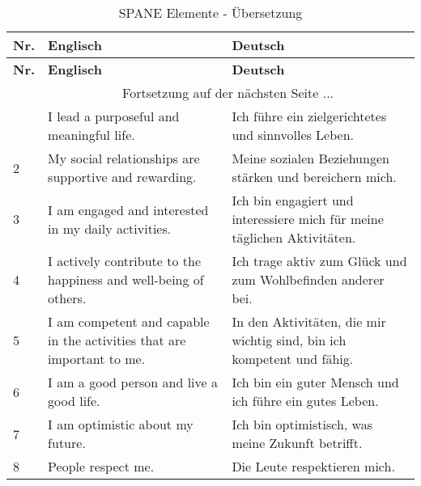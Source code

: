 \begin{RaggedRight}
\begin{center}
    \begin{longtable}[t]{|p{0.8 cm}|p{6.6 cm}|p{6.6 cm}|}
    \caption{SPANE Elemente - Übersetzung} \\ \hline
        \textbf{Nr.} & \textbf{Englisch} & \textbf{Deutsch} \\ \hline
        \endfirsthead
        \hline
        \textbf{Nr.} & \textbf{Englisch} & \textbf{Deutsch} \\ \hline
        \endhead 
        & \multicolumn{2}{|c|}{Fortsetzung auf der nächsten Seite $...$ } \\ \hline
        \endfoot
        \hline
        \endlastfoot
        1 & I lead a purposeful and meaningful life. & Ich führe ein zielgerichtetes und sinnvolles Leben.\\
        2 & My social relationships are supportive and rewarding. & Meine sozialen Beziehungen stärken und bereichern mich. \\
        3 & I am engaged and interested in my daily activities. & Ich bin engagiert und interessiere mich für meine täglichen Aktivitäten.\\
        4 & I actively contribute to the happiness and well-being of others. & Ich trage aktiv zum Glück und zum Wohlbefinden anderer bei.\\
        5 & I am competent and capable in the activities that are important to me. & In den Aktivitäten, die mir wichtig sind, bin ich kompetent und fähig.\\
        6 & I am a good person and live a good life. & Ich bin ein guter Mensch und ich führe ein gutes Leben. \\
        7 & I am optimistic about my future. & Ich bin optimistisch, was meine Zukunft betrifft.\\
        8 & People respect me. & Die Leute respektieren mich.\\        
    \end{longtable}
	\label{tab:FsElemente}
\end{center}

\end{RaggedRight}
